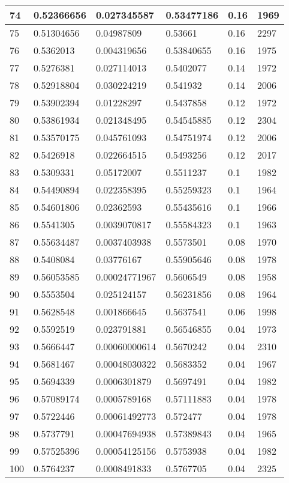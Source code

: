 \begin{longtable}{|l|l|l|l|l|l|}
74 & 0.52366656 & 0.027345587 & 0.53477186 & 0.16 & 1969 \\ \hline 
75 & 0.51304656 & 0.04987809 & 0.53661 & 0.16 & 2297 \\ \hline 
76 & 0.5362013 & 0.004319656 & 0.53840655 & 0.16 & 1975 \\ \hline 
77 & 0.5276381 & 0.027114013 & 0.5402077 & 0.14 & 1972 \\ \hline 
78 & 0.52918804 & 0.030224219 & 0.541932 & 0.14 & 2006 \\ \hline 
79 & 0.53902394 & 0.01228297 & 0.5437858 & 0.12 & 1972 \\ \hline 
80 & 0.53861934 & 0.021348495 & 0.54545885 & 0.12 & 2304 \\ \hline 
81 & 0.53570175 & 0.045761093 & 0.54751974 & 0.12 & 2006 \\ \hline 
82 & 0.5426918 & 0.022664515 & 0.5493256 & 0.12 & 2017 \\ \hline 
83 & 0.5309331 & 0.05172007 & 0.5511237 & 0.1 & 1982 \\ \hline 
84 & 0.54490894 & 0.022358395 & 0.55259323 & 0.1 & 1964 \\ \hline 
85 & 0.54601806 & 0.02362593 & 0.55435616 & 0.1 & 1966 \\ \hline 
86 & 0.5541305 & 0.0039070817 & 0.55584323 & 0.1 & 1963 \\ \hline 
87 & 0.55634487 & 0.0037403938 & 0.5573501 & 0.08 & 1970 \\ \hline 
88 & 0.5408084 & 0.03776167 & 0.55905646 & 0.08 & 1978 \\ \hline 
89 & 0.56053585 & 0.00024771967 & 0.5606549 & 0.08 & 1958 \\ \hline 
90 & 0.5553504 & 0.025124157 & 0.56231856 & 0.08 & 1964 \\ \hline 
91 & 0.5628548 & 0.001866645 & 0.5637541 & 0.06 & 1998 \\ \hline 
92 & 0.5592519 & 0.023791881 & 0.56546855 & 0.04 & 1973 \\ \hline 
93 & 0.5666447 & 0.00060000614 & 0.5670242 & 0.04 & 2310 \\ \hline 
94 & 0.5681467 & 0.00048030322 & 0.5683352 & 0.04 & 1967 \\ \hline 
95 & 0.5694339 & 0.0006301879 & 0.5697491 & 0.04 & 1982 \\ \hline 
96 & 0.57089174 & 0.0005789168 & 0.57111883 & 0.04 & 1978 \\ \hline 
97 & 0.5722446 & 0.00061492773 & 0.572477 & 0.04 & 1978 \\ \hline 
98 & 0.5737791 & 0.00047694938 & 0.57389843 & 0.04 & 1965 \\ \hline 
99 & 0.57525396 & 0.00054125156 & 0.5753938 & 0.04 & 1982 \\ \hline 
100 & 0.5764237 & 0.0008491833 & 0.5767705 & 0.04 & 2325 \\ \hline 
\end{longtable}